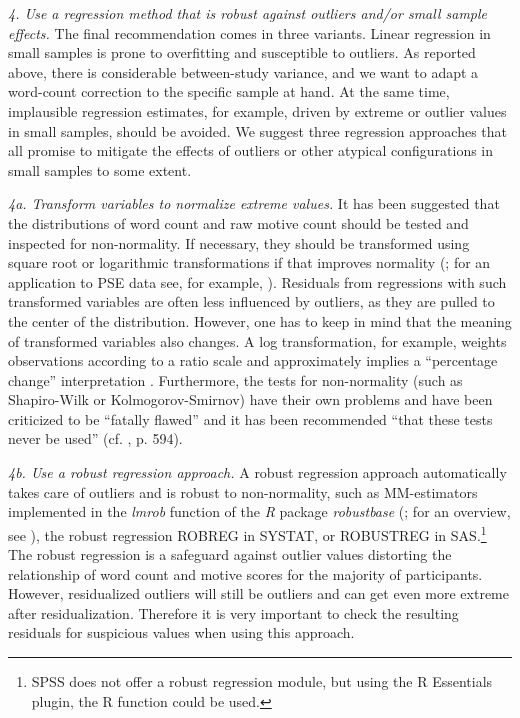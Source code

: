\documentclass[jou,a4paper]{apa6}\usepackage[]{graphicx}\usepackage[]{color}
\begin{document}
\emph{4. Use a regression method that is robust against outliers and/or small sample effects.}
The final recommendation comes in three variants. Linear regression in small samples is prone to overfitting and susceptible to outliers. As reported above, there is considerable between-study variance, and we want to adapt a word-count correction to the specific sample at hand. At the same time, implausible regression estimates, for example, driven by extreme or outlier values in small samples, should be avoided. We suggest three regression approaches that all promise to mitigate the effects of outliers or other atypical configurations in small samples to some extent.

\emph{4a. Transform variables to normalize extreme values.} It has been suggested that the distributions of word count and raw motive count should be tested and inspected for non-normality. If necessary, they should be transformed using square root or logarithmic transformations if that improves normality (; for an application to PSE data see, for example, ). Residuals from regressions with such transformed variables are often less influenced by outliers, as they are pulled to the center of the distribution. However, one has to keep in mind that the meaning of transformed variables also changes. A log transformation, for example, weights observations according to a ratio scale and approximately implies a ``percentage change'' interpretation \parencite{keene_LogTransformationSpecial_1995}. Furthermore, the tests for non-normality (such as Shapiro-Wilk or Kolmogorov-Smirnov) have their own problems and have been criticized to be ``fatally flawed'' and it has been recommended ``that these tests never be used'' (cf. , p. 594).

\emph{4b. Use a robust regression approach.}
A robust regression approach automatically takes care of outliers and is robust to non-normality, such as MM-estimators implemented in the \emph{lmrob} function of the \emph{R} package \emph{robustbase} (; for an overview, see ), the robust regression ROBREG in SYSTAT, or ROBUSTREG in SAS.\footnote{SPSS does not offer a robust regression module, but using the R Essentials plugin, the R function could be used.} The robust regression is a safeguard against outlier values distorting the relationship of word count and motive scores for the majority of participants. However, residualized outliers will still be outliers and can get even more extreme after residualization. Therefore it is very important to check the resulting residuals for suspicious values when using this approach.
\end{document}
